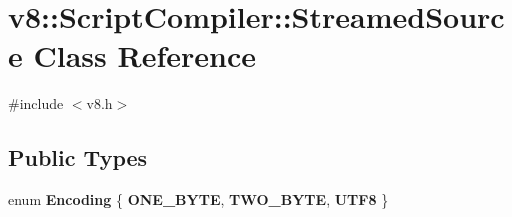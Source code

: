 \hypertarget{classv8_1_1ScriptCompiler_1_1StreamedSource}{}\section{v8\+:\+:Script\+Compiler\+:\+:Streamed\+Source Class Reference}
\label{classv8_1_1ScriptCompiler_1_1StreamedSource}


{\ttfamily \#include $<$v8.\+h$>$}

\subsection*{Public Types}
\begin{DoxyCompactItemize}
\item 
\mbox{\label{classv8_1_1ScriptCompiler_1_1StreamedSource_a17b52f85ac22120e687b16357d662da2}} 
enum {\bfseries Encoding} \{ {\bfseries O\+N\+E\+\_\+\+B\+Y\+TE}, 
{\bfseries T\+W\+O\+\_\+\+B\+Y\+TE}, 
{\bfseries U\+T\+F8}
 \}
\end{DoxyCompactItemize}
